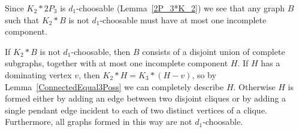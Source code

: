 Since $K_2*2P_3$ is $d_1$-choosable (Lemma~\ref{2P_3*K_2}) we see that any
graph $B$ such that $K_2*B$ is not $d_1$-choosable must have at most one
incomplete component.

\begin{lem}
\label{K2Classification}
If $K_2*B$ is not $d_1$-choosable, then $B$ consists of a disjoint union of
complete subgraphs, together with at most one incomplete component $H$.  If $H$
has a dominating vertex $v$, then $K_2*H = K_3*(H-v)$, so by
Lemma~\ref{ConnectedEqual3Poss} we can
completely describe $H$.  Otherwise $H$ is formed either by adding an edge
between two disjoint cliques or by adding a single pendant edge incident to 
each of two distinct vertices of a clique.
Furthermore, all graphs formed in this way are not $d_1$-choosable.
\end{lem}
